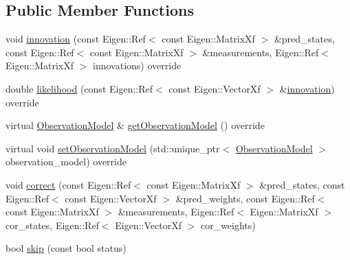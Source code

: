 \subsection*{Public Member Functions}
\begin{DoxyCompactItemize}
\item 
void \mbox{\hyperlink{classbfl_1_1PFCorrectionDecorator_ac468b6ca9f6991217b6771173c253b42}{innovation}} (const Eigen\+::\+Ref$<$ const Eigen\+::\+Matrix\+Xf $>$ \&pred\+\_\+states, const Eigen\+::\+Ref$<$ const Eigen\+::\+Matrix\+Xf $>$ \&measurements, Eigen\+::\+Ref$<$ Eigen\+::\+Matrix\+Xf $>$ innovations) override
\item 
double \mbox{\hyperlink{classbfl_1_1PFCorrectionDecorator_a39c3201dbd0821427b684228451faea5}{likelihood}} (const Eigen\+::\+Ref$<$ const Eigen\+::\+Vector\+Xf $>$ \&\mbox{\hyperlink{classbfl_1_1PFCorrectionDecorator_ac468b6ca9f6991217b6771173c253b42}{innovation}}) override
\item 
virtual \mbox{\hyperlink{classbfl_1_1ObservationModel}{Observation\+Model}} \& \mbox{\hyperlink{classbfl_1_1PFCorrectionDecorator_a7bafd701e4a97efc55ba7fea6125cc7f}{get\+Observation\+Model}} () override
\item 
virtual void \mbox{\hyperlink{classbfl_1_1PFCorrectionDecorator_a2574837bfdfa72f3da92b4cdacfe5a89}{set\+Observation\+Model}} (std\+::unique\+\_\+ptr$<$ \mbox{\hyperlink{classbfl_1_1ObservationModel}{Observation\+Model}} $>$ observation\+\_\+model) override
\item 
void \mbox{\hyperlink{classbfl_1_1PFCorrection_a7d8e7f910fe5ebcb7d8ed678c6f38836}{correct}} (const Eigen\+::\+Ref$<$ const Eigen\+::\+Matrix\+Xf $>$ \&pred\+\_\+states, const Eigen\+::\+Ref$<$ const Eigen\+::\+Vector\+Xf $>$ \&pred\+\_\+weights, const Eigen\+::\+Ref$<$ const Eigen\+::\+Matrix\+Xf $>$ \&measurements, Eigen\+::\+Ref$<$ Eigen\+::\+Matrix\+Xf $>$ cor\+\_\+states, Eigen\+::\+Ref$<$ Eigen\+::\+Vector\+Xf $>$ cor\+\_\+weights)
\item 
bool \mbox{\hyperlink{classbfl_1_1PFCorrection_ab25e625ea12fe257e0eb85d465835e62}{skip}} (const bool status)
\end{DoxyCompactItemize}
